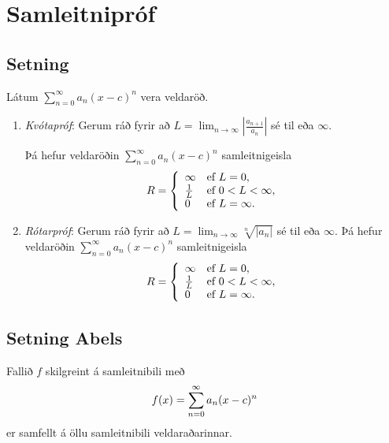 \documentclass[b5paper,10pt,icelandic]{sphinxmanual}
\begin{document}

\section{Samleitnipróf}
\label{kafli10:samleitniprof}\label{kafli10:index-3}

\subsection{Setning}
\label{kafli10:id2}
Látum \(\sum_{n=0}^\infty a_n(x-c)^n\) vera veldaröð.
\begin{enumerate}
\item {} 
\textit{Kvótapróf}: Gerum ráð fyrir að
\(L=\lim_{n\rightarrow\infty}\left|\frac{a_{n+1}}{a_n}\right|\)
sé til eða \(\infty\).

Þá hefur veldaröðin \(\sum_{n=0}^\infty a_n(x-c)^n\)
samleitnigeisla
\begin{gather}
\begin{split}R= \left\{\begin{array}{ll}
\infty & \mbox{ef }L=0,\\
\frac{1}{L} & \mbox{ef }0<L<\infty,\\
0 & \mbox{ef }L=\infty.\\
\end{array} \right.\end{split}\notag
\end{gather}
\item {} 
\textit{Rótarpróf}: Gerum ráð fyrir að
\(L=\lim_{n\rightarrow\infty}\sqrt[n]{|a_n|}\) sé til eða
\(\infty\). Þá hefur veldaröðin
\(\sum_{n=0}^\infty a_n(x-c)^n\) samleitnigeisla
\begin{gather}
\begin{split}R= \left\{\begin{array}{ll}
\infty & \mbox{ef }L=0,\\
\frac{1}{L} & \mbox{ef }0<L<\infty,\\
0 & \mbox{ef }L=\infty.\\
\end{array}
\right.\end{split}\notag
\end{gather}
\end{enumerate}


\subsection{Setning Abels}
\label{kafli10:index-4}\label{kafli10:setning-abels}
Fallið \(f\) skilgreint á samleitnibili með
\begin{gather}
\begin{split}f(x)=\sum_{n=0}^\infty a_n(x-c)^n\end{split}\notag
\end{gather}
er samfellt á öllu samleitnibili veldaraðarinnar.
\end{document}
